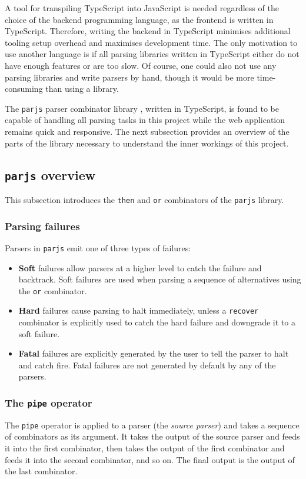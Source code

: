 A tool for transpiling TypeScript into JavaScript is needed regardless of the choice of the backend programming language, as the frontend is written in TypeScript. Therefore, writing the backend in TypeScript minimises additional tooling setup overhead and maximises development time. The only motivation to use another language is if all parsing libraries written in TypeScript either do not have enough features or are too slow. Of course, one could also not use any parsing libraries and write parsers by hand, though it would be more time-consuming than using a library.

The \lstinline{parjs} parser combinator library \cite{parjs}, written in TypeScript, is found to be capable of handling all parsing tasks in this project while the web application remains quick and responsive. The next subsection provides an overview of the parts of the library necessary to understand the inner workings of this project.

\subsection{\texorpdfstring{\lstinline{parjs}}{parjs} overview}
This subsection introduces the \lstinline{then} and \lstinline{or} combinators of the \lstinline{parjs} library. 

\subsubsection{Parsing failures}
Parsers in \lstinline{parjs} emit one of three types of failures:
\begin{itemize}
    \item \textbf{Soft} failures allow parsers at a higher level to catch the failure and backtrack. Soft failures are used when parsing a sequence of alternatives using the \lstinline{or} combinator.
    \item \textbf{Hard} failures cause parsing to halt immediately, unless a \lstinline{recover} combinator is explicitly used to catch the hard failure and downgrade it to a soft failure.
    \item \textbf{Fatal} failures are explicitly generated by the user to tell the parser to halt and catch fire. Fatal failures are not generated by default by any of the parsers.
\end{itemize}

\subsubsection{The \lstinline{pipe} operator}
The \lstinline{pipe} operator \cite{parjs:pipe} is applied to a parser (the \textit{source parser}) and takes a sequence of combinators as its argument. It takes the output of the source parser and feeds it into the first combinator, then takes the output of the first combinator and feeds it into the second combinator, and so on. The final output is the output of the last combinator.

